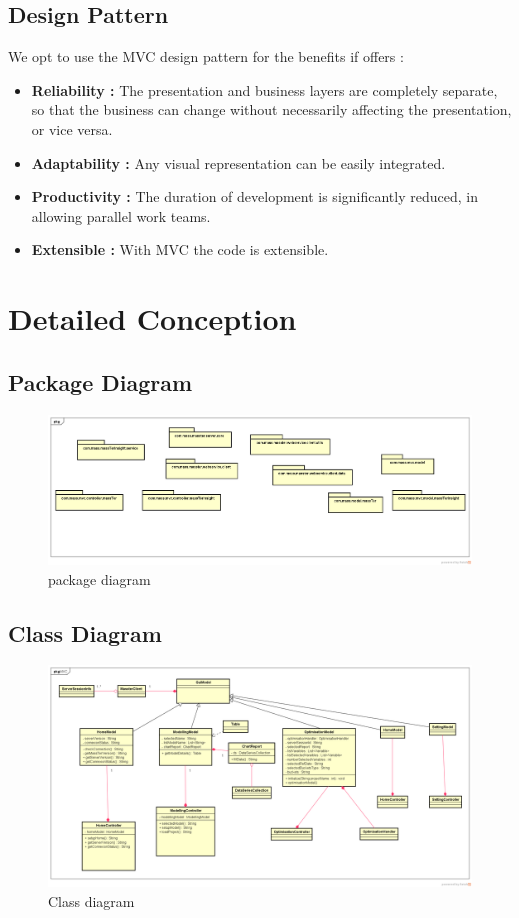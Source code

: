 \documentclass[12pt]{article}
\begin{document}
    \clearpage
	\newpage
	\subsection{Design Pattern}
		We opt to use the MVC design pattern for the benefits if offers :
	\begin{itemize}
		\item \textbf{Reliability : }The presentation and business layers are completely separate, so that the business can change without necessarily affecting the presentation, or vice versa.
		\item \textbf{Adaptability : }Any visual representation can be easily integrated.
		\item \textbf{Productivity : }The duration of development is significantly reduced, in allowing parallel work teams.
		\item \textbf{Extensible : } With MVC the code is extensible.
	\end{itemize}

	\clearpage
    \newpage

	\section{Detailed Conception}
    \clearpage
	\newpage
	\subsection{Package Diagram}
		\begin{figure}[h]
		\centering
		\includegraphics[width=1\textwidth]{packageDiagram.png}
		\caption{package diagram}
	\end{figure}  
	
	\clearpage
	\newpage
	\subsection{Class Diagram}
	\begin{figure}[h]
		\centering
		\includegraphics[width=1\textwidth]{classDiagram.png}
		\caption{Class diagram}
	\end{figure} 
	\clearpage
	\newpage
\end{document}
